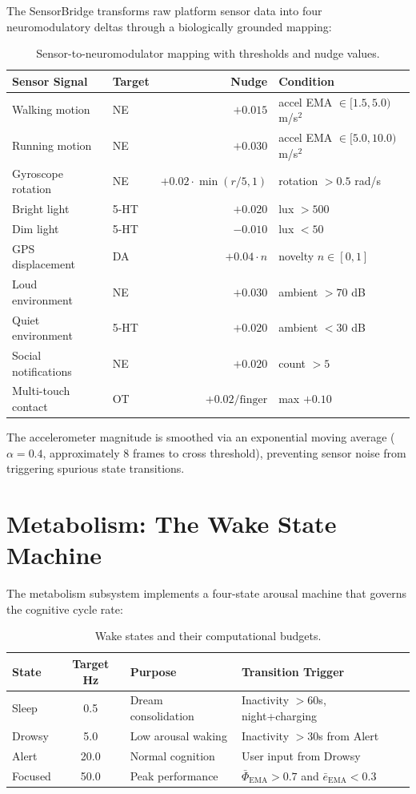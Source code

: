 \documentclass[12pt]{book}
\begin{document}
The SensorBridge transforms raw platform sensor data into four neuromodulatory deltas through a biologically grounded mapping:

\begin{table}[H]
\centering
\caption{Sensor-to-neuromodulator mapping with thresholds and nudge values.}
\label{tab:sensor-nudges}
\small
\begin{tabular}{llrl}
\toprule
\textbf{Sensor Signal} & \textbf{Target} & \textbf{Nudge} & \textbf{Condition} \\
\midrule
Walking motion & NE & $+0.015$ & accel EMA $\in [1.5, 5.0)$ m/s$^2$ \\
Running motion & NE & $+0.030$ & accel EMA $\in [5.0, 10.0)$ m/s$^2$ \\
Gyroscope rotation & NE & $+0.02 \cdot \min(r/5, 1)$ & rotation $> 0.5$ rad/s \\
Bright light & 5-HT & $+0.020$ & lux $> 500$ \\
Dim light & 5-HT & $-0.010$ & lux $< 50$ \\
GPS displacement & DA & $+0.04 \cdot n$ & novelty $n \in [0, 1]$ \\
Loud environment & NE & $+0.030$ & ambient $> 70$ dB \\
Quiet environment & 5-HT & $+0.020$ & ambient $< 30$ dB \\
Social notifications & NE & $+0.020$ & count $> 5$ \\
Multi-touch contact & OT & $+0.02/\text{finger}$ & max $+0.10$ \\
\bottomrule
\end{tabular}
\end{table}

The accelerometer magnitude is smoothed via an exponential moving average ($\alpha = 0.4$, approximately 8 frames to cross threshold), preventing sensor noise from triggering spurious state transitions.

\section{Metabolism: The Wake State Machine}

The metabolism subsystem implements a four-state arousal machine that governs the cognitive cycle rate:

\begin{table}[H]
\centering
\caption{Wake states and their computational budgets.}
\label{tab:wake-states}
\begin{tabular}{lcll}
\toprule
\textbf{State} & \textbf{Target Hz} & \textbf{Purpose} & \textbf{Transition Trigger} \\
\midrule
Sleep & 0.5 & Dream consolidation & Inactivity $> 60$s, night+charging \\
Drowsy & 5.0 & Low arousal waking & Inactivity $> 30$s from Alert \\
Alert & 20.0 & Normal cognition & User input from Drowsy \\
Focused & 50.0 & Peak performance & $\bar{\Phi}_{\text{EMA}} > 0.7$ and $\bar{e}_{\text{EMA}} < 0.3$ \\
\bottomrule
\end{tabular}
\end{table}
\end{document}
